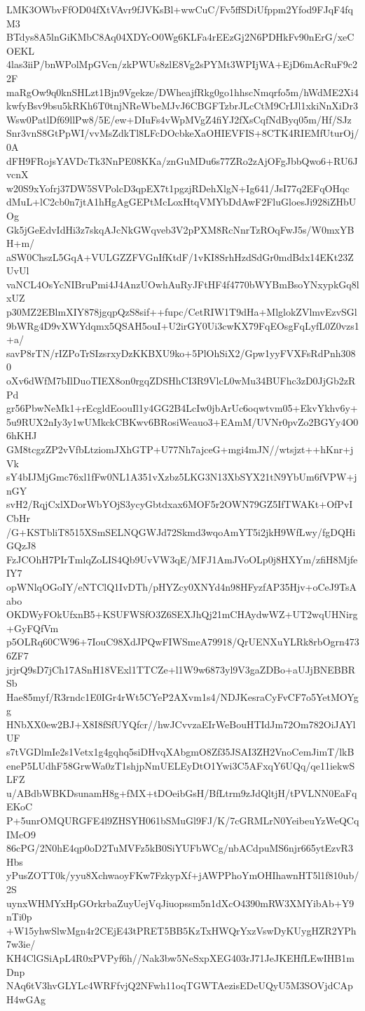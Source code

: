 LMK3OWbvFfOD04fXtVAvr9fJVKsBl+wwCuC/Fv5ffSDiUfppm2Yfod9FJqF4fqM3
BTdys8A5lnGiKMbC8Aq04XDYcO0Wg6KLFa4rEEzGj2N6PDHkFv90nErG/xeCOEKL
4las3iiP/bnWPolMpGVcn/zkPWUs8zlE8Vg2sPYMt3WPIjWA+EjD6mAcRuF9c22F
maRgOw9q0knSHLzt1Bjn9Vgekze/DWheajfRkg0go1hhscNmqrfo5m/hWdME2Xi4
kwfyBsv9bsu5kRKh6T0tnjNReWbeMJvJ6CBGFTzbrJLcCtM9CrIJl1xkiNnXiDr3
Wsw0PatlDf69llPw8/5E/ew+DIuFs4vWpMVgZ4fiYJ2fXsCqfNdByq05m/Hf/SJz
Snr3vnS8GtPpWI/vvMsZdkTl8LFcDOcbkeXaOHIEVFIS+8CTK4RIEMfUturOj/0A
dFH9FRojsYAVDcTk3NnPE08KKa/znGuMDu6s77ZRo2zAjOFgJbbQwo6+RU6JvcnX
w20S9xYofrj37DW5SVPolcD3qpEX7t1pgzjRDehXlgN+Ig641/JsI77q2EFqOHqc
dMuL+lC2cb0n7jtA1hHgAgGEPtMcLoxHtqVMYbDdAwF2FluGloesJi928iZHbUOg
Gk5jGeEdvIdHi3z7skqAJcNkGWqveb3V2pPXM8RcNnrTzROqFwJ5s/W0mxYBH+m/
aSW0ChszL5GqA+VULGZZFVGnIfKtdF/1vKI8SrhHzdSdGr0mdBdx14EKt23ZUvUl
vaNCL4OsYcNIBruPmi4J4AnzUOwhAuRyJFtHF4f4770bWYBmBsoYNxypkGq8lxUZ
p30MZ2EBlmXIY878jgqpQzS8sif++fupc/CetRIW1T9dHa+MlglokZVlmvEzvSGl
9bWRg4D9vXWYdqmx5QSAH5ouI+U2irGY0Ui3cwKX79FqEOsgFqLyfL0Z0vzs1+a/
savP8rTN/rIZPoTrSIzsrxyDzKKBXU9ko+5PlOhSiX2/Gpw1yyFVXFsRdPnh3080
oXv6dWfM7bIlDuoTIEX8on0rgqZDSHhCI3R9VlcL0wMu34BUFhc3zD0JjGb2zRPd
gr56PbwNeMk1+rEcgldEoouIl1y4GG2B4LcIw0jbArUc6oqwtvm05+EkvYkhv6y+
5u9RUX2nIy3y1wUMkckCBKwv6BRosiWeauo3+EAmM/UVNr0pvZo2BGYy4O06hKHJ
GM8tcgzZP2vVfbLtziomJXhGTP+U77Nh7ajceG+mgi4mJN//wtsjzt++hKnr+jVk
sY4bIJMjGmc76xl1fFw0NL1A351vXzbz5LKG3N13XbSYX21tN9YbUm6fVPW+jnGY
svH2/RqjCxlXDorWbYOjS3ycyGbtdxax6MOF5r2OWN79GZ5IfTWAKt+OfPvICbHr
/G+KSTbliT8515XSmSELNQGWJd72Skmd3wqoAmYT5i2jkH9WfLwy/fgDQHiGQzJ8
FzJCOhH7PIrTmlqZoLIS4Qb9UvVW3qE/MFJ1AmJVoOLp0j8HXYm/zfiH8MjfeIY7
opWNlqOGoIY/eNTClQ1IvDTh/pHYZcy0XNYd4n98HFyzfAP35Hjv+oCeJ9TsAabo
OKDWyFOkUfxnB5+KSUFWSfO3Z6SEXJhQj21mCHAydwWZ+UT2wqUHNirg+GyFQfVm
p5OLRq60CW96+7IouC98XdJPQwFIWSmeA79918/QrUENXuYLRk8rbOgrn4736ZF7
jrjrQ9sD7jCh17ASnH18VExl1TTCZe+l1W9w6873yl9V3gaZDBo+aUJjBNEBBRSb
Hae85myf/R3rndc1E0IGr4rWt5CYeP2AXvm1s4/NDJKesraCyFvCF7o5YetMOYgg
HNbXX0ew2BJ+X8I8fSfUYQfcr//hwJCvvzaEIrWeBouHTIdJm72Om782OiJAYlUF
s7tVGDlmIe2s1Vetx1g4gqhq5siDHvqXAbgmO8Zf35JSAI3ZH2VnoCemJimT/lkB
eneP5LUdhF58GrwWa0zT1shjpNmUELEyDtO1Ywi3C5AFxqY6UQq/qe11iekwSLFZ
u/ABdbWBKDsunamH8g+fMX+tDOeibGsH/BfLtrm9zJdQltjH/tPVLNN0EaFqEKoC
P+5unrOMQURGFE4l9ZHSYH061bSMuGl9FJ/K/7cGRMLrN0YeibeuYzWeQCqIMcO9
86cPG/2N0hE4qp0oD2TuMVFz5kB0SiYUFbWCg/nbACdpuMS6njr665ytEzvR3Hbs
yPusZOTT0k/yyu8XchwaoyFKw7FzkypXf+jAWPPhoYmOHIhawnHT5l1f810ub/2S
uynxWHMYxHpGOrkrbaZuyUejVqJiuopssm5n1dXcO4390mRW3XMYibAb+Y9nTi0p
+W15yhwSlwMgn4r2CEjE43tPRET5BB5KzTxHWQrYxzVswDyKUygHZR2YPh7w3ie/
KH4ClGSiApL4R0xPVPyf6h//Nak3bw5NeSxpXEG403rJ71JeJKEHfLEwIHB1mDnp
NAq6tV3hvGLYLc4WRFfvjQ2NFwh11oqTGWTAezisEDeUQyU5M3SOVjdCApH4wGAg
